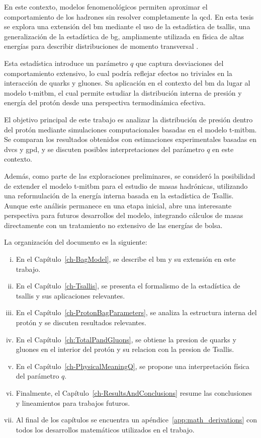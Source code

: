 En este contexto, modelos fenomenológicos permiten aproximar el comportamiento de los hadrones sin resolver completamente la \gls{qcd}. En esta tesis se explora una extensión del \gls{bm} mediante el uso de la estadística de \gls{tsallis}, una generalización de la estadística de \gls{bg}, ampliamente utilizada en física de altas energías para describir distribuciones de momento transversal \cite{Tsallis1988,Beck_2003,Tsallis2009,Tsallis_2009,Marques_2015}.

Esta estadística introduce un parámetro $q$ que captura desviaciones del comportamiento extensivo, lo cual podría reflejar efectos no triviales en la interacción de quarks y gluones. Su aplicación en el contexto del \gls{bm} da lugar al modelo \gls{t-mitbm}, el cual permite estudiar la distribución interna de presión y energía del protón desde una perspectiva termodinámica efectiva.

El objetivo principal de este trabajo es analizar la distribución de presión dentro del protón mediante simulaciones computacionales basadas en el modelo \gls{t-mitbm}. Se comparan los resultados obtenidos con estimaciones experimentales basadas en \gls{dvcs}\cite{Hall2018} y \gls{gpd}, y se discuten posibles interpretaciones del parámetro $q$ en este contexto.

Además, como parte de las exploraciones preliminares, se consideró la posibilidad de extender el modelo \gls{t-mitbm} para el estudio de masas hadrónicas, utilizando una reformulación de la energía interna basada en la estadística de Tsallis. Aunque este análisis permanece en una etapa inicial, abre una interesante perspectiva para futuros desarrollos del modelo, integrando cálculos de masas directamente con un tratamiento no extensivo de las energías de bolsa.

La organización del documento es la siguiente:
\begin{enumerate}[i.]
    \item En el Capítulo~\ref{ch-BagModel}, se describe el \gls{bm} y su extensión en este trabajo.
    \item En el Capítulo~\ref{ch-Tsallis}, se presenta el formalismo de la estadística de \gls{tsallis} y sus aplicaciones relevantes.
    \item En el Capítulo~\ref{ch-ProtonBagParameters}, se analiza la estructura interna del protón y se discuten resultados relevantes.
    \item En el Capítulo~\ref{ch:TotalPandGluons}, se obtiene la presion de quarks y gluones en el interior del protón y su relacion con la presion de Tsallis.
    \item En el Capítulo~\ref{ch-PhysicalMeaningQ}, se propone una interpretación física del parámetro $q$.
    \item Finalmente, el Capítulo~\ref{ch-ResultsAndConclusions} resume las conclusiones y lineamientos para trabajos futuros.
    \item Al final de los capítulos se encuentra un apéndice~\ref{app:math_derivations} con todos los desarrollos matemáticos utilizados en el trabajo.
\end{enumerate}

